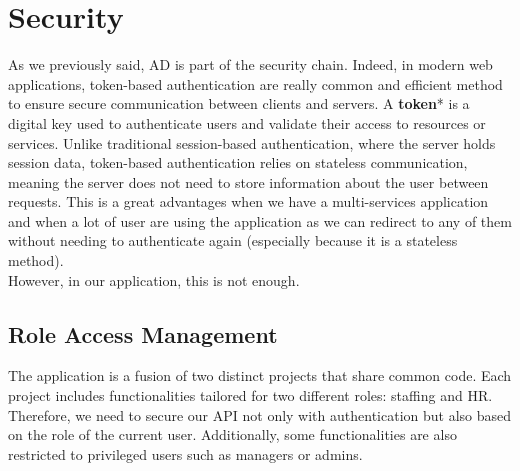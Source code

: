 \documentclass[12pt,a4paper,table,english]{article}
\begin{document}
	
	
	\newpage
	
	\section{Security}

	As we previously said, AD is part of the security chain. Indeed, in modern web applications, token-based authentication are really common and efficient method to ensure secure communication between clients and servers. A \textbf{token}* is a digital key used to authenticate users and validate their access to resources or services. Unlike traditional session-based authentication, where the server holds session data, token-based authentication relies on stateless communication, meaning the server does not need to store information about the user between requests. This is a great advantages when we have a multi-services application and when a lot of user are using the application as we can redirect to any of them without needing to authenticate again (especially because it is a stateless method).\\
	However, in our application, this is not enough.
	
	\subsection{Role Access Management}
	The application is a fusion of two distinct projects that share common code. Each project includes functionalities tailored for two different roles: staffing and HR. Therefore, we need to secure our API not only with authentication but also based on the role of the current user. Additionally, some functionalities are also restricted to privileged users such as managers or admins. 
	
\end{document}
